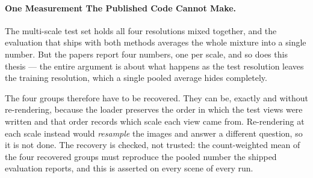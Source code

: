 \paragraph{One Measurement The Published Code Cannot Make.} The multi-scale
test set holds all four resolutions mixed together, and the evaluation that ships
with both methods averages the whole mixture into a single number. But the papers
report four numbers, one per scale, and so does this thesis --- the entire
argument is about what happens as the test resolution leaves the training
resolution, which a single pooled average hides completely.

The four groups therefore have to be recovered. They can be, exactly and without
re-rendering, because the loader preserves the order in which the test views were
written and that order records which scale each view came from. Re-rendering at
each scale instead would \emph{resample} the images and answer a different
question, so it is not done. The recovery is checked, not trusted: the
count-weighted mean of the four recovered groups must reproduce the pooled number the shipped evaluation reports, and this is asserted
on every scene of every run.
